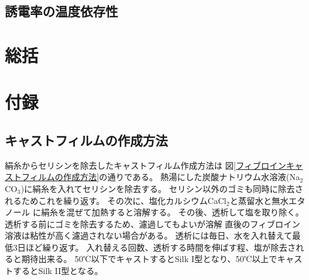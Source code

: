 \documentclass[dvipdfmx,12pt,a4paper]{jreport}
\begin{document}
			\section{誘電率の温度依存性}
	\chapter{総括}
	\chapter{付録}
	\section{キャストフィルムの作成方法}
	絹糸からセリシンを除去したキャストフィルム作成方法は
	図\ref{フィブロインキャストフィルムの作成方法}の通りである。
	熱湯にした炭酸ナトリウム水溶液(Na$_2$CO$_3$)に絹糸を入れてセリシンを除去する。
	セリシン以外のゴミも同時に除去されるためこれを繰り返す。
	その次に、塩化カルシウムCaCl$_2$と蒸留水と無水エタノール
	に絹糸を混ぜて加熱すると溶解する。
	その後、透析して塩を取り除く。
	透析する前にゴミを除去するため、濾過してもよいが溶解
	直後のフィブロイン溶液は粘性が高く濾過されない場合がある。
	透析には毎日、水を入れ替えて最低3日ほど繰り返す。
	入れ替える回数、透析する時間を伸ばす程、塩が除去されると期待出来る。
	50℃以下でキャストするとSilk I型となり、50℃以上でキャストするとSilk II型となる。
\end{document}
